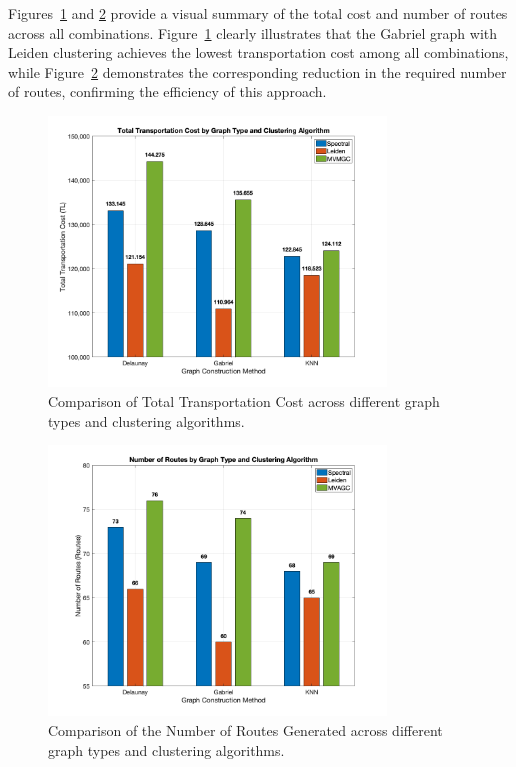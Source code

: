 Figures~\ref{fig:cost_comparison} and \ref{fig:routes_comparison} provide a visual summary of the total cost and number of routes across all combinations. Figure~\ref{fig:cost_comparison} clearly illustrates that the Gabriel graph with Leiden clustering achieves the lowest transportation cost among all combinations, while Figure~\ref{fig:routes_comparison} demonstrates the corresponding reduction in the required number of routes, confirming the efficiency of this approach.

\begin{figure}[h]
    \centering
    \includegraphics[width=0.8\textwidth]{img/cost_comparison}
    \caption{Comparison of Total Transportation Cost across different graph types and clustering algorithms.}
    \label{fig:cost_comparison}
\end{figure}

\begin{figure}[h]
    \centering
    \includegraphics[width=0.8\textwidth]{img/route_count_comparison}
    \caption{Comparison of the Number of Routes Generated across different graph types and clustering algorithms.}
    \label{fig:routes_comparison}
\end{figure}

